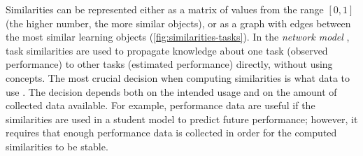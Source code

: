 Similarities can be represented either as a matrix of values from the range $[0, 1]$
(the higher number, the more similar objects),
or as a graph with edges between the most similar learning objects
(\cref{fig:similarities-tasks}).
In the \emph{network model} \cite{rihak-phd}, task similarities are used to propagate
knowledge about one task (observed performance) to other tasks (estimated performance)
directly, without using concepts.
The most crucial decision when computing similarities is what data to use
\cite{alg.similarity}.
The decision depends both on the intended usage and on the amount of collected data
available. For example, performance data are useful if the similarities are used in a
student model to predict future performance; however, it requires that enough
performance data is collected in order for the computed similarities to be stable.

